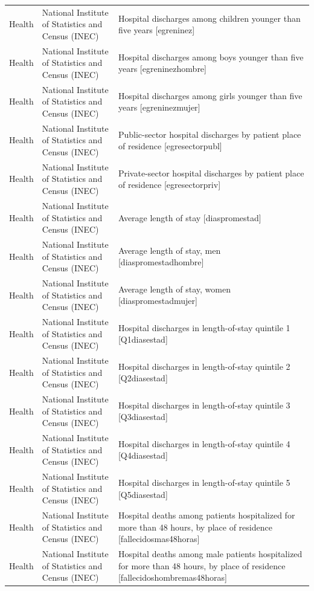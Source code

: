 \begin{landscape}
\begin{longtable}[t]{>{\raggedright\arraybackslash}p{3.4cm}>{\raggedright\arraybackslash}p{5.6cm}>{\raggedright\arraybackslash}p{12.4cm}}
Health & National Institute of Statistics and Census (INEC) & Hospital discharges among children younger than five years [egreninez]\\
Health & National Institute of Statistics and Census (INEC) & Hospital discharges among boys younger than five years [egreninezhombre]\\
Health & National Institute of Statistics and Census (INEC) & Hospital discharges among girls younger than five years [egreninezmujer]\\
Health & National Institute of Statistics and Census (INEC) & Public-sector hospital discharges by patient place of residence [egresectorpubl]\\
Health & National Institute of Statistics and Census (INEC) & Private-sector hospital discharges by patient place of residence [egresectorpriv]\\
Health & National Institute of Statistics and Census (INEC) & Average length of stay [diaspromestad]\\
Health & National Institute of Statistics and Census (INEC) & Average length of stay, men [diaspromestadhombre]\\
Health & National Institute of Statistics and Census (INEC) & Average length of stay, women [diaspromestadmujer]\\
Health & National Institute of Statistics and Census (INEC) & Hospital discharges in length-of-stay quintile 1 [Q1diasestad]\\
Health & National Institute of Statistics and Census (INEC) & Hospital discharges in length-of-stay quintile 2 [Q2diasestad]\\
Health & National Institute of Statistics and Census (INEC) & Hospital discharges in length-of-stay quintile 3 [Q3diasestad]\\
Health & National Institute of Statistics and Census (INEC) & Hospital discharges in length-of-stay quintile 4 [Q4diasestad]\\
Health & National Institute of Statistics and Census (INEC) & Hospital discharges in length-of-stay quintile 5 [Q5diasestad]\\
Health & National Institute of Statistics and Census (INEC) & Hospital deaths among patients hospitalized for more than 48 hours, by place of residence [fallecidosmas48horas]\\
Health & National Institute of Statistics and Census (INEC) & Hospital deaths among male patients hospitalized for more than 48 hours, by place of residence [fallecidoshombremas48h\allowbreak{}oras]\\

\end{longtable}
\end{landscape}
